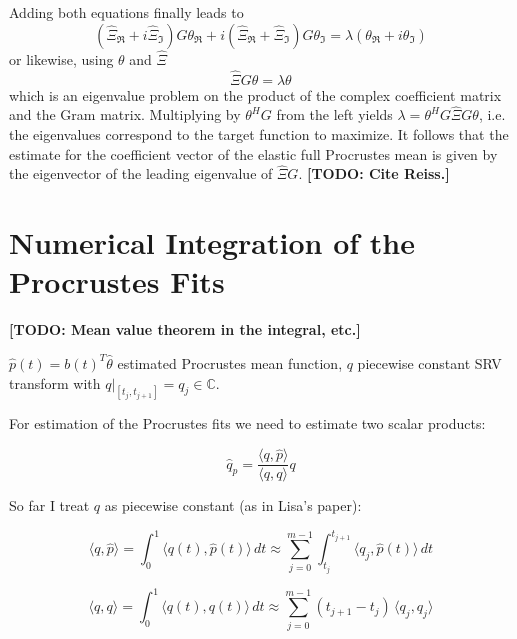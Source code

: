 Adding both equations finally leads to  
$$( \hat\Xi_\Re + i \hat\Xi_\Im) G \theta_\Re + i (\hat\Xi_\Re + \hat\Xi_\Im) G \theta_\Im = \lambda ( \theta_\Re + i \theta_\Im)$$
or likewise, using $\theta$ and $\hat\Xi$
$$ \hat\Xi G \theta = \lambda \theta $$
which is an eigenvalue problem on the product of the complex coefficient matrix and the Gram matrix.
Multiplying by $\theta^H G$ from the left yields $\lambda = \theta^H G \hat\Xi G \theta$, i.e. the eigenvalues correspond to the target function to maximize.
It follows that the estimate for the coefficient vector of the elastic full Procrustes mean is given by the eigenvector of the leading eigenvalue of $\hat\Xi G$.
\textbf{[TODO: Cite Reiss.]}



\section{Numerical Integration of the Procrustes Fits}
\label{sec:pfit}
\textbf{[TODO: Mean value theorem in the integral, etc.]}

$\hat{p}(t) = b(t)^T \hat{\theta}$ estimated Procrustes mean function, $q$ piecewise constant SRV transform with $q|_{[t_j, t_{j+1}]} = q_j \in \mathbb{C}$.

For estimation of the Procrustes fits we need to estimate two scalar products:

$$ \hat{q}_{p} = \frac{\langle q,\hat{p} \rangle}{\langle q, q \rangle} q $$

So far I treat $q$ as piecewise constant (as in Lisa's paper):

$$ \langle q, \hat{p} \rangle = \int_0^1 \langle q(t), \hat{p}(t) \rangle \, dt \approx \sum_{j=0}^{m-1} \int_{t_j}^{t_{j+1}} \langle q_j, \hat{p}(t) \rangle \, dt $$

$$ \langle q, q \rangle = \int_0^1 \langle q(t), q(t) \rangle \, dt \approx \sum_{j=0}^{m-1} (t_{j+1} - t_j) \, \langle q_j, q_j \rangle $$

